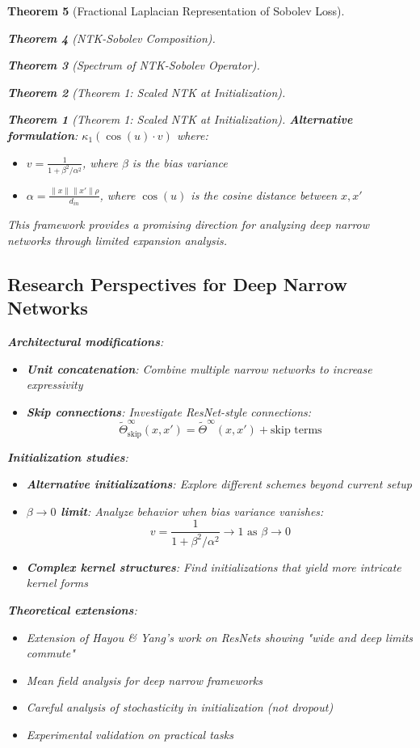 \documentclass{article}
\newtheorem{theorem}{Theorem}[section]
\begin{document}
\begin{theorem}[Fractional Laplacian Representation of Sobolev Loss]
\begin{theorem}[NTK-Sobolev Composition]
\begin{theorem}[Spectrum of NTK-Sobolev Operator]
\begin{theorem}[Theorem 1: Scaled NTK at Initialization]
\begin{theorem}[Theorem 1: Scaled NTK at Initialization]
\textbf{Alternative formulation}: $\kappa_1(\cos(u) \cdot v)$ where:
\begin{itemize}
\item $v = \frac{1}{1 + \beta^2/\alpha^2}$, where $\beta$ is the bias variance
\item $\alpha = \frac{\|x\| \|x'\| \rho}{d_{in}}$, where $\cos(u)$ is the cosine distance between $x, x'$
\end{itemize}

This framework provides a promising direction for analyzing deep narrow networks through limited expansion analysis.

\subsection{Research Perspectives for Deep Narrow Networks}

\textbf{Architectural modifications}:
   \begin{itemize}
\item \textbf{Unit concatenation}: Combine multiple narrow networks to increase expressivity
\item \textbf{Skip connections}: Investigate ResNet-style connections:
  \[ \tilde{\Theta}^\infty_{\text{skip}}(x, x') = \tilde{\Theta}^\infty(x, x') + \text{skip terms} \]
   \end{itemize}

\textbf{Initialization studies}:
\begin{itemize}
\item \textbf{Alternative initializations}: Explore different schemes beyond current setup
\item \textbf{$\beta \to 0$ limit}: Analyze behavior when bias variance vanishes:
  \[ v = \frac{1}{1 + \beta^2/\alpha^2} \to 1 \text{ as } \beta \to 0 \]
\item \textbf{Complex kernel structures}: Find initializations that yield more intricate kernel forms
\end{itemize}

\textbf{Theoretical extensions}:
\begin{itemize}
\item Extension of Hayou \& Yang's work on ResNets showing "wide and deep limits commute"
\item Mean field analysis for deep narrow frameworks
\item Careful analysis of stochasticity in initialization (not dropout)
\item Experimental validation on practical tasks
\end{itemize}


\end{theorem}
\end{theorem}
\end{theorem}
\end{theorem}
\end{theorem}
\end{document}
